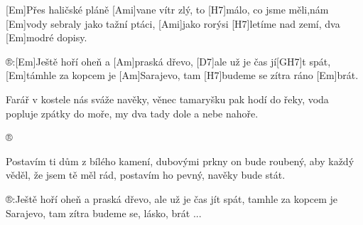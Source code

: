 
[Em]Přes haličské pláně [Ami]vane vítr zlý,
to [H7]málo, co jsme měli,nám [Em]vody sebraly
jako tažní ptáci, [Ami]jako rorýsi
[H7]letíme nad zemí, dva [Em]modré dopisy.

®:[Em]Ještě hoří oheň a [Am]praská dřevo,
[D7]ale už je čas jí[GH7]t spát, [Em]támhle za kopcem je [Am]Sarajevo,
tam [H7]budeme se zítra ráno [Em]brát.

Farář v kostele nás sváže navěky,
věnec tamaryšku pak hodí do řeky,
voda popluje zpátky do moře,
my dva tady dole a nebe nahoře. 

®

Postavím ti dům z bílého kamení,
dubovými prkny on bude roubený,
aby každý věděl, že jsem tě měl rád,
postavím ho pevný, navěky bude stát.

®:Ještě hoří oheň a praská dřevo,
ale už je čas jít spát,
tamhle za kopcem je Sarajevo,
tam zítra budeme se, lásko, brát ...



